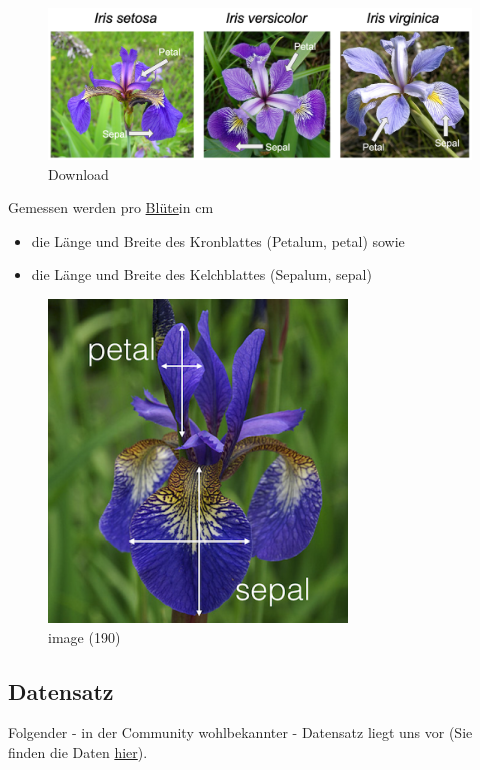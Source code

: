 \documentclass[
  oneside]{book}
\providecommand{\tightlist}{%
  \setlength{\itemsep}{0pt}\setlength{\parskip}{0pt}}
\begin{document}
\begin{figure}
\centering
\includegraphics[width=1\textwidth,height=\textheight]{assets/daten.assets/Download.png}
\caption{Download}
\end{figure}

Gemessen werden pro \href{https://de.wikipedia.org/wiki/Bl\%C3\%BCte}{Blüte}in cm 

\begin{itemize}
\tightlist
\item
  die Länge und Breite des Kronblattes (Petalum, petal) sowie 
\item
  die Länge und Breite des Kelchblattes (Sepalum, sepal)
\end{itemize}

\begin{figure}
\centering
\includegraphics{assets/daten.assets/image_messung-16426070933692.png}
\caption{image (190)}
\end{figure}

\hypertarget{datensatz}{%
\subsection{Datensatz}\label{datensatz}}

Folgender - in der Community wohlbekannter - Datensatz liegt uns vor (Sie finden die Daten \href{https://syncandshare.lrz.de/getlink/fi89kxTJ5yLRaW5mnpyrofVK/Iris_p.xlsx}{hier}).
\end{document}
